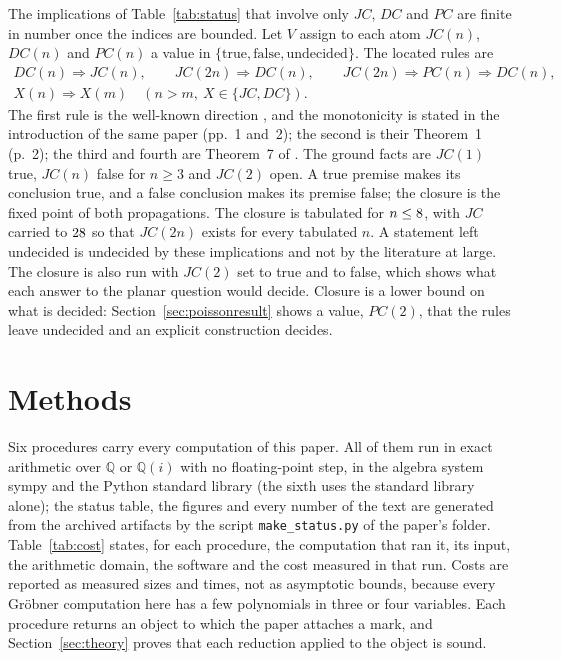 \documentclass[11pt]{article}
\theoremstyle{remark}
\newcommand{\Q}{\mathbb{Q}}
\begin{document}
The implications of Table~\ref{tab:status} that involve only $JC$, $DC$ and $PC$ are finite in number once the indices are bounded. Let $V$ assign to each atom $JC(n)$, $DC(n)$ and $PC(n)$ a value in $\{\text{true},\text{false},\text{undecided}\}$. The located rules are
\begin{equation}\label{eq:rules}
\begin{gathered}
DC(n)\Rightarrow JC(n),\qquad JC(2n)\Rightarrow DC(n),\qquad JC(2n)\Rightarrow PC(n)\Rightarrow DC(n),\\
X(n)\Rightarrow X(m)\quad(n>m,\ X\in\{JC,DC\}).
\end{gathered}
\end{equation}
The first rule is the well-known direction \cite[p.~2]{BKK2007}, and the monotonicity is stated in the introduction of the same paper (pp.~1 and~2); the second is their Theorem~1 (p.~2); the third and fourth are Theorem~7 of \cite[p.~14]{AvdE2007}. The ground facts are $JC(1)$ true, $JC(n)$ false for $n\ge3$ and $JC(2)$ open. A true premise makes its conclusion true, and a false conclusion makes its premise false; the closure is the fixed point of both propagations. The closure is tabulated for $n\le8$, with $JC$ carried to $28$ so that $JC(2n)$ exists for every tabulated $n$. A statement left undecided is undecided by these implications and not by the literature at large. The closure is also run with $JC(2)$ set to true and to false, which shows what each answer to the planar question would decide. Closure is a lower bound on what is decided: Section~\ref{sec:poissonresult} shows a value, $PC(2)$, that the rules leave undecided and an explicit construction decides.

\section{Methods}\label{sec:methods}

Six procedures carry every computation of this paper. All of them run in exact arithmetic over $\Q$ or $\Q(i)$ with no floating-point step, in the algebra system sympy and the Python standard library (the sixth uses the standard library alone); the status table, the figures and every number of the text are generated from the archived artifacts by the script \texttt{make\_status.py} of the paper's folder. Table~\ref{tab:cost} states, for each procedure, the computation that ran it, its input, the arithmetic domain, the software and the cost measured in that run. Costs are reported as measured sizes and times, not as asymptotic bounds, because every Gr\"obner computation here has a few polynomials in three or four variables. Each procedure returns an object to which the paper attaches a mark, and Section~\ref{sec:theory} proves that each reduction applied to the object is sound.
\end{document}
